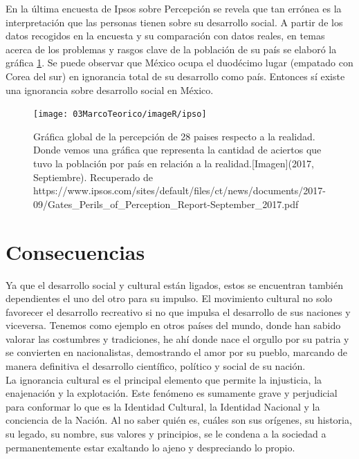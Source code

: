 En la última encuesta de Ipsos sobre Percepción\cite{pp04} se revela que tan errónea es la interpretación que las personas tienen sobre su desarrollo social. A partir de los datos recogidos en la encuesta y su comparación con datos reales, en temas acerca de los problemas y rasgos clave de la población de su país se elaboró la gráfica \ref{fig:ipso}. Se puede observar que México ocupa el duodécimo lugar (empatado con Corea del sur) en ignorancia total de su desarrollo como país. Entonces sí existe una ignorancia sobre desarrollo social en México.
\\[1pt]

\begin{figure}
	\centering 
	\texttt{[image: 03MarcoTeorico/imageR/ipso]}
	\caption{Gráfica global de la percepción de 28 paises respecto a la realidad. Donde vemos una gráfica que representa la cantidad de aciertos que tuvo la población por país en relación a la realidad.[Imagen](2017, Septiembre). Recuperado de https://www.ipsos.com/sites/default/files/ct/news/documents/2017-09/Gates\_Perils\_of\_Perception\_Report-September\_2017.pdf}
	\label{fig:ipso}
\end{figure}

\section{Consecuencias}
Ya que el desarrollo social y cultural están ligados, estos se encuentran también dependientes el uno del otro para su impulso. El movimiento cultural no solo favorecer el desarrollo recreativo si no que impulsa el desarrollo de sus naciones y viceversa. Tenemos como ejemplo en otros países del mundo, donde han sabido valorar las costumbres y tradiciones, he ahí donde nace el orgullo por su patria y se convierten en nacionalistas, demostrando el amor por su pueblo, marcando de manera definitiva el desarrollo científico, político y social de su nación\cite{pp06}.
\\[1pt]

La ignorancia cultural es el principal elemento que permite la injusticia, la enajenación y la explotación. Este fenómeno es sumamente grave y perjudicial para conformar lo que es la Identidad Cultural, la Identidad Nacional y la conciencia de la Nación. Al no saber quién es, cuáles son sus orígenes, su historia, su legado, su nombre, sus valores y principios, se le condena a la sociedad a permanentemente estar exaltando lo ajeno y despreciando lo propio.
\\[1pt]

